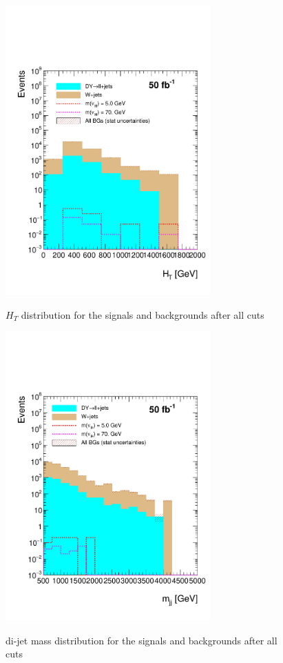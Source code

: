  \begin{figure}[h] 
 \centering
 \caption{$H_T$ distribution for the signals and backgrounds after all cuts}
 \includegraphics[width=0.7\textwidth]{./Capitulos/Analysis/AfterVBFCUTS/HT_MET_20} 
 \label{HT_VBF}
 \end{figure} 
 
  \begin{figure}[h] 
 \centering
 \caption{di-jet mass distribution for the signals and backgrounds after all cuts}
 \includegraphics[width=0.7\textwidth]{./Capitulos/Analysis/AfterVBFCUTS/mjj_MET_20} 
 \label{diJetMass_VBF}
 \end{figure} 
 
